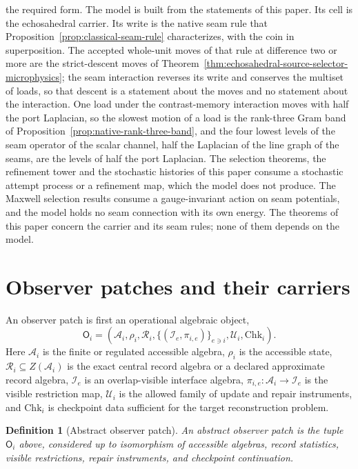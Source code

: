 \documentclass[11pt]{article}
\newtheorem{definition}[theorem]{Definition}
\theoremstyle{remark}
\theoremstyle{plain}
\begin{document}
the required form.
The model is built from the statements of this paper. Its cell is the
echosahedral carrier. Its write is the native seam rule that
Proposition~\ref{prop:classical-seam-rule} characterizes, with the coin in
superposition. The accepted whole-unit moves of that rule at difference two
or more are the strict-descent moves of
Theorem~\ref{thm:echosahedral-source-selector-microphysics}; the seam
interaction reverses its write and conserves the multiset of loads, so that
descent is a statement about the moves and no statement about the
interaction. One load under the contrast-memory interaction moves with half
the port Laplacian, so the slowest
motion of a load is the rank-three Gram band of
Proposition~\ref{prop:native-rank-three-band}, and the four lowest levels of
the seam operator of the scalar channel, half the Laplacian of the line graph
of the seams, are the levels of half the port Laplacian. The selection
theorems, the refinement tower and the stochastic histories of this paper
consume a stochastic attempt process or a refinement map, which the model
does not produce. The Maxwell selection results consume a gauge-invariant
action on seam potentials, and the model holds no seam connection with its
own energy.
The theorems of this paper concern the carrier and its seam rules; none of
them depends on the model.


\tableofcontents
\newpage
\section{Observer patches and their carriers}
\label{sec:observer-patch-semantics}

An observer patch is first an operational algebraic object,
\[
\mathsf O_i=
\left(
\mathcal A_i,\rho_i,\mathcal R_i,
\{(\mathcal I_e,\pi_{i,e})\}_{e\ni i},
\mathcal U_i,\mathrm{Chk}_i
\right).
\]
Here \(\mathcal A_i\) is the finite or regulated accessible algebra, \(\rho_i\) is the accessible
state, \(\mathcal R_i\subseteq Z(\mathcal A_i)\) is the exact central record algebra or a declared
approximate record algebra, \(\mathcal I_e\) is an overlap-visible interface algebra,
\(\pi_{i,e}:\mathcal A_i\to\mathcal I_e\) is the visible restriction map, \(\mathcal U_i\) is the
allowed family of update and repair instruments, and \(\mathrm{Chk}_i\) is checkpoint data
sufficient for the target reconstruction problem.

\begin{definition}[Abstract observer patch]
An abstract observer patch is the tuple \(\mathsf O_i\) above, considered up to isomorphism of
accessible algebras, record statistics, visible restrictions, repair instruments, and checkpoint
continuation.
\end{definition}
\end{document}
